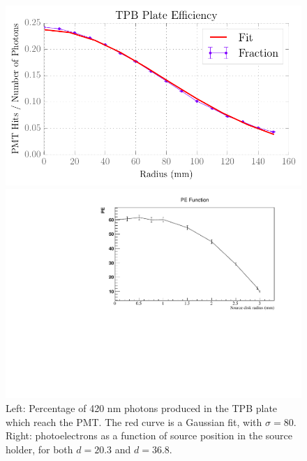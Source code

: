 \documentclass[aps,pra,notitlepage,groupedaddress]{revtex4-1}
\begin{document}
\begin{figure}
	\begin{minipage}{0.49\textwidth}
		\includegraphics[width=1.0\textwidth]{figures/plt2pmt}
	\end{minipage}
	\begin{minipage}{0.49\textwidth}
		\includegraphics[width=1.0\textwidth]{figures/pefunct}
	\end{minipage}
	\caption{Left: Percentage of 420 nm photons produced in the TPB plate which reach the PMT. The red curve is a Gaussian fit, with $\sigma = 80$. Right: photoelectrons as a function of source position in the source holder, for both $d=20.3$ and $d=36.8$.\label{fig:plt2pmt}}
\end{figure}
\end{document}
